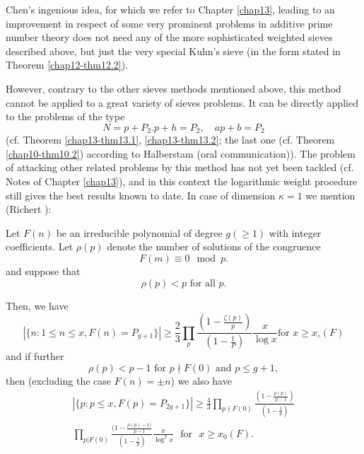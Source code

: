 Chen's ingenious idea, for which we refer to Chapter \ref{chap13}, leading to
an improvement in respect of some very prominent problems in additive
prime number theory does not need any of the more sophisticated
weighted sieves described above, but just the very special Kuhn's
sieve (in the form stated in Theorem \ref{chap12-thm12.2}). 

However, contrary to the other sieves methods mentioned above, this
method cannot be applied to a great variety of sieves problems. It can
be directly applied to the problems of the type 
\begin{equation*}
N=p+P_2.p+h=P_2, \quad ap+b=P_2 \tag{12.40}\label{eq12.40}
\end{equation*}
(cf. Theorem \ref{chap13-thm13.1}, \ref{chap13-thm13.2}; the last one
(cf. Theorem \ref{chap10-thm10.2}) according to Halberstam (oral
communication)). The problem of attacking other related problems by
this method has not yet been tackled (cf. Notes of Chapter
\ref{chap13}), and in this context the logarithmic weight procedure
still gives the best results known to date. In case of dimension
$\kappa=1$ we mention (Richert \cite{key1}): 

Let $F(n)$ be an irreducible polynomial of degree $g(\geq 1)$ with
integer coefficients. Let $\rho(p)$ denote the number of
solutions of the congruence 
\begin{equation*}
F(m) \equiv 0 \mod p. \tag{12.41}\label{eq12.41}
\end{equation*}\pageoriginale
and suppose that
\begin{equation*}
\rho(p)<p \text{ for all }p. \tag{12.42}\label{eq12.42}
\end{equation*}

Then, we have
\begin{equation*}
|\{n:1 \leq n \leq x, F(n)=P_{g+1}\}| \geq \frac{2}{3} \prod_{p}
\frac{(1-\frac{\zeta(p)}{p})}{(1-\frac{1}{P})} \frac{x}{\log x} \text{
  for } x \geq x_\circ(F) \tag{12.43}\label{eq12.43} 
\end{equation*}
and if further
\begin{equation*}
\rho (p)<p-1 \text{ for } p \nmid F(0) \text{ and } p \leq
g+1, \tag{12.44}\label{eq12.44} 
\end{equation*}
then (excluding the case $F(n)=\pm n$) we also have
\begin{gather*}
|\{p: p \leq x, F(p)=P_{2g+1}\}| \geq \frac{4}{3}\prod_{p \nmid F(0)}
\frac{(1-\frac{\rho(p)}{p-1})}{(1-\frac{1}{p})}\\
\prod_{p |F(0)}
\frac{(1-\frac{\rho(p)-1)}{p-1}}{(1-\frac{1}{p})} \frac{x}{\log^2 x}
\text{~ for~ } x \geq x_0(F). \tag{12.45}\label{eq12.45} 
\end{gather*}

